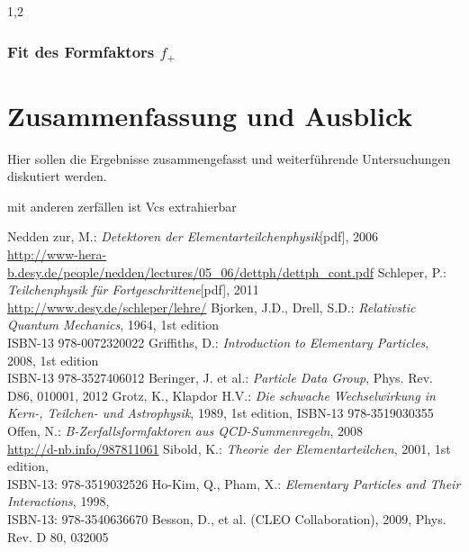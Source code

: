 \documentclass[11pt,a4paper,twoside]{report}
\begin{document}
\begin{spacing}{1,2}
\subsection{Fit des Formfaktors $f_+$}


\chapter{Zusammenfassung und Ausblick}

Hier sollen die Ergebnisse zusammengefasst und weiterf\"uhrende Untersuchungen diskutiert werden. 

mit anderen zerfällen ist Vcs extrahierbar

\begin{appendix}
%
\end{appendix}
\newpage

\renewcommand{\bibname}{Literaturverzeichnis}
% 
%
\begin{thebibliography}{xxx}
 Nedden zur, M.: \textit{Detektoren der Elementarteilchenphysik}[pdf], 2006\\ \href{http://www-hera-b.desy.de/people/nedden/lectures/05_06/dettph/dettph_cont.pdf}{http://www-hera-b.desy.de/people/nedden/lectures/05\_06/dettph/dettph\_cont.pdf}
 Schleper, P.: \textit{Teilchenphysik für Fortgeschrittene}[pdf], 2011\\ \href{http://www.desy.de/~schleper/lehre/}{http://www.desy.de/\midtilde schleper/lehre/}
 Bjorken, J.D., Drell, S.D.: \textit{Relativstic Quantum Mechanics}, 1964, 1st edition \\ISBN-13 978-0072320022 
 Griffiths, D.: \textit{Introduction to Elementary Particles}, 2008, 1st edition \\ISBN-13 978-3527406012
  Beringer, J. et al.: \textit{Particle Data Group}, Phys. Rev. D86, 010001, 2012
 Grotz, K., Klapdor H.V.: \textit{Die schwache Wechselwirkung in Kern-, Teilchen- und Astrophysik}, 1989, 1st edition, ISBN-13 978-3519030355
 Offen, N.: \textit{B-Zerfallsformfaktoren aus QCD-Summenregeln}, 2008\\ \href{http://d-nb.info/987811061}{http://d-nb.info/987811061}
 Sibold, K.: \textit{Theorie der Elementarteilchen}, 2001, 1st edition, \\ISBN-13: 978-3519032526
 Ho-Kim, Q., Pham, X.: \textit{Elementary Particles and Their Interactions}, 1998, \\ ISBN-13: 978-3540636670
 Besson, D., et al. (CLEO Collaboration), 2009, Phys. Rev. D 80, 032005 
\end{thebibliography}



\newpage
\thispagestyle{empty}
\ \\



\end{spacing}
\end{document}
